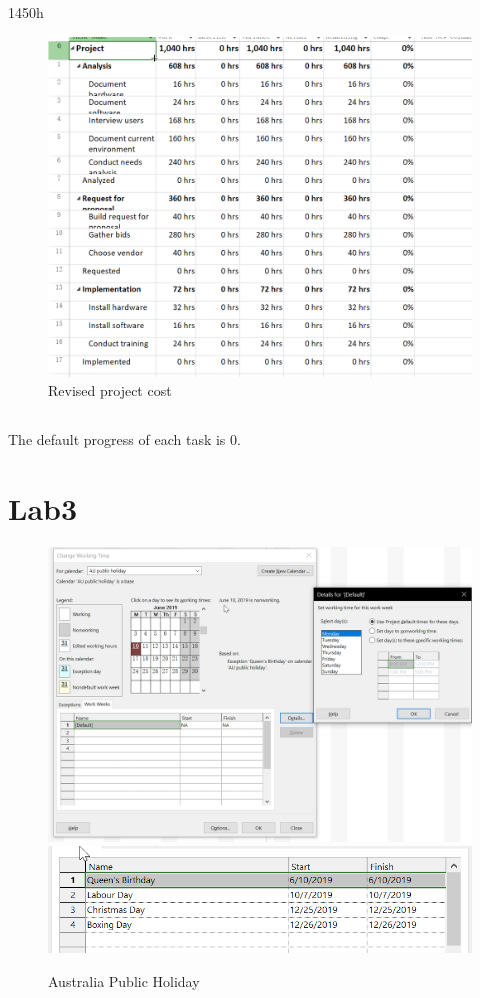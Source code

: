 \documentclass[runningheads]{llncs}
\begin{document}
\subsection{}
1450h
\begin{figure}[H]
    \centering
    \includegraphics[width=1.0\textwidth]{./image/f5}
    \caption{Revised project cost}
\end{figure}
\subsection{}
The default progress of each task is 0.



\section{Lab3}
\begin{figure}[H]
    \centering
    \includegraphics[width=1.0\textwidth]{./image/l2}
    \includegraphics[width=1.0\textwidth]{./image/l3}
    \caption{Australia Public Holiday}
\end{figure}
\end{document}

